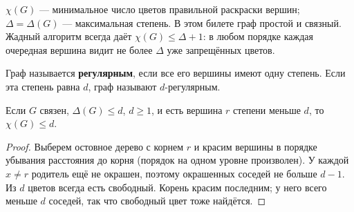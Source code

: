 \begin{definition}[Раскраска]
\(\chi(G)\) — минимальное число цветов правильной раскраски вершин;
\(\Delta=\Delta(G)\) — максимальная степень. В этом билете граф простой и связный.
Жадный алгоритм всегда даёт \(\chi(G)\le\Delta+1\): в любом порядке
каждая очередная вершина видит не более \(\Delta\) уже запрещённых цветов.
\end{definition}
Граф называется \textbf{регулярным}, если все его вершины имеют одну степень.
Если эта степень равна \(d\), граф называют \(d\)-регулярным.\par\medskip
\begin{lemma}\label{lem:greedy}
Если \(G\) связен, \(\Delta(G)\le d\), \(d\ge1\), и есть вершина \(r\)
степени меньше \(d\), то \(\chi(G)\le d\).
\end{lemma}
\begin{proof}
Выберем остовное дерево с корнем \(r\) и красим вершины в порядке
убывания расстояния до корня (порядок на одном уровне произволен).
У каждой \(x\ne r\) родитель ещё не окрашен, поэтому окрашенных
соседей не больше \(d-1\). Из \(d\) цветов всегда есть свободный.
Корень красим последним; у него всего меньше \(d\) соседей,
так что свободный цвет тоже найдётся.
\end{proof}


